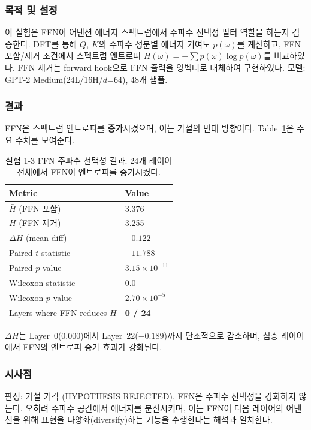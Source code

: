 \documentclass[11pt,a4paper]{article}
\begin{document}
\subsubsection{목적 및 설정}

이 실험은 FFN이 어텐션 에너지 스펙트럼에서 주파수 선택성 필터 역할을 하는지 검증한다.
DFT를 통해 $Q$, $K$의 주파수 성분별 에너지 기여도 $p(\omega)$를 계산하고, FFN 포함/제거 조건에서 스펙트럼 엔트로피 $H(\omega) = -\sum p(\omega) \log p(\omega)$를 비교하였다.
FFN 제거는 forward hook으로 FFN 출력을 영벡터로 대체하여 구현하였다.
모델: GPT-2 Medium(24L/16H/$d$=64), 48개 샘플.

\subsubsection{결과}

FFN은 스펙트럼 엔트로피를 \textbf{증가}시켰으며, 이는 가설의 반대 방향이다.
Table~\ref{tab:ffn}은 주요 수치를 보여준다.

\begin{table}[H]
\centering
\caption{실험 1-3 FFN 주파수 선택성 결과. 24개 레이어 전체에서 FFN이 엔트로피를 증가시켰다.}
\label{tab:ffn}
\begin{tabular}{ll}
\toprule
\textbf{Metric} & \textbf{Value} \\
\midrule
$\bar{H}$ (FFN 포함) & 3.376 \\
$\bar{H}$ (FFN 제거) & 3.255 \\
$\Delta H$ (mean diff) & $-0.122$ \\
Paired $t$-statistic & $-11.788$ \\
Paired $p$-value & $3.15 \times 10^{-11}$ \\
Wilcoxon statistic & 0.0 \\
Wilcoxon $p$-value & $2.70 \times 10^{-5}$ \\
Layers where FFN reduces $H$ & \textbf{0 / 24} \\
\bottomrule
\end{tabular}
\end{table}

$\Delta H$는 Layer~0(0.000)에서 Layer~22($-0.189$)까지 단조적으로 감소하며, 심층 레이어에서 FFN의 엔트로피 증가 효과가 강화된다.

\subsubsection{시사점}

판정: \textcolor{failure}{가설 기각 (HYPOTHESIS REJECTED)}.
FFN은 주파수 선택성을 강화하지 않는다.
오히려 주파수 공간에서 에너지를 분산시키며, 이는 FFN이 다음 레이어의 어텐션을 위해 표현을 다양화(diversify)하는 기능을 수행한다는 해석과 일치한다.
\end{document}
